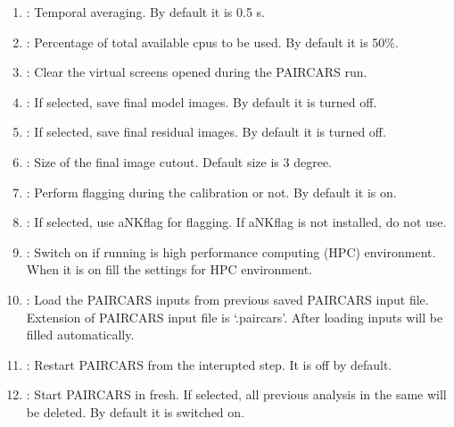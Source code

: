 \documentclass[letterpaper,10pt,english]{sphinxmanual}
\begin{document}
\begin{enumerate}
\item {} 
\sphinxAtStartPar
{} : Temporal averaging. By default it is 0.5 s.

\item {} 
\sphinxAtStartPar
{} : Percentage of total available cpus to be used. By default it is 50\%.

\item {} 
\sphinxAtStartPar
{} : Clear the virtual screens opened during the P\sphinxhyphen{}AIRCARS run.

\item {} 
\sphinxAtStartPar
{} : If selected, save final model images. By default it is turned off.

\item {} 
\sphinxAtStartPar
{} : If selected, save final residual images. By default it is turned off.

\item {} 
\sphinxAtStartPar
{} : Size of the final image cutout. Default size is 3 degree.

\item {} 
\sphinxAtStartPar
{} : Perform flagging during the calibration or not. By default it is on.

\item {} 
\sphinxAtStartPar
{} : If selected, use aNKflag for flagging. If aNKflag is not installed, do not use.

\item {} 
\sphinxAtStartPar
{} : Switch on if running is high performance computing (HPC) environment. When it is on fill the settings for HPC environment.

\item {} 
\sphinxAtStartPar
{} : Load the P\sphinxhyphen{}AIRCARS inputs from previous saved P\sphinxhyphen{}AIRCARS input file. Extension of P\sphinxhyphen{}AIRCARS input file is ‘.paircars’. After loading inputs will be filled automatically.

\item {} 
\sphinxAtStartPar
{} : Restart P\sphinxhyphen{}AIRCARS from the interupted step. It is off by default.

\item {} 
\sphinxAtStartPar
{} : Start P\sphinxhyphen{}AIRCARS in fresh. If selected, all previous analysis in the same  will be deleted. By default it is switched on.

\end{enumerate}
\end{document}
